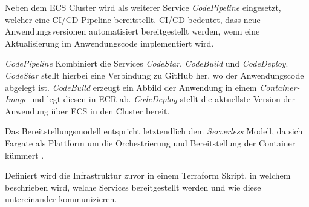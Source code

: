 Neben dem \ac{ECS} Cluster wird als weiterer Service \textit{\gls{CodePipeline}} eingesetzt, welcher eine \ac{CI/CD}-Pipeline bereitstellt. \ac{CI/CD} bedeutet, dass neue Anwendungsversionen automatisiert bereitgestellt werden, wenn eine Aktualisierung im Anwendungscode implementiert wird. 

\textit{\gls{CodePipeline}} Kombiniert die Services \textit{CodeStar}, \textit{CodeBuild} und \textit{CodeDeploy}. \textit{CodeStar} stellt hierbei eine Verbindung zu \gls{GitHub} her, wo der Anwendungscode abgelegt ist. \textit{CodeBuild} erzeugt ein Abbild der Anwendung in einem \textit{Container-Image} und legt diesen in \ac{ECR} ab. \textit{CodeDeploy} stellt die aktuellste Version der Anwendung über \ac{ECS} in den Cluster bereit.


Das Bereitstellungsmodell entspricht letztendlich dem \textit{Serverless} Modell, da sich \gls{Fargate} als Plattform um die Orchestrierung und Bereitstellung der Container kümmert \cite[Vgl.][]{AWSFargate}\cite[Vgl][S. 16]{CNCF2018}.

Definiert wird die Infrastruktur zuvor in einem \gls{Terraform} Skript, in welchem beschrieben wird, welche Services bereitgestellt werden und wie diese untereinander kommunizieren.